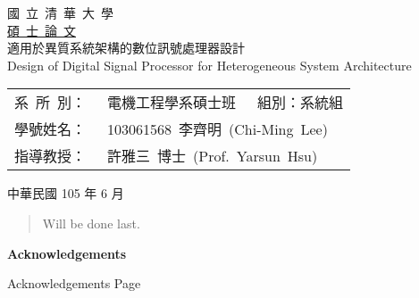 \documentclass[12pt]{article}
\begin{document}
\begin{CJK}{UTF8}{bkai}

\begin{titlepage}
\begin{center}
\Huge 國~立~清~華~大~學 \\ [1.5ex]
\Huge \underline{碩~士~論~文} \\
\vspace*{10ex}
\huge 適用於異質系統架構的數位訊號處理器設計 \\
\vspace*{1ex}
\huge Design of Digital Signal Processor for Heterogeneous System Architecture  \\

\null
\vfill

\Large
\begin{tabular}{r@{\centering} @{}l}
    系\ 所\ 別：~&電機工程學系碩士班\ \ \ 組別：系統組	\\ [1.5ex]
    學號姓名：~&103061568~李齊明~(Chi-Ming~Lee)      \\ [1.5ex]
    指導教授：~&許雅三~博士~(Prof.~Yarsun~Hsu)       \\
	
\end{tabular}

\vspace*{2ex}
\Large 中華民國 105 年 6 月
\end{center}
\end{titlepage}

\doublespacing
{}
\setcounter{page}{3}

\renewcommand{\abstractnamefont}{\normalfont\bfseries}
\renewcommand{\abstracttextfont}{\normalfont}
\setlength{\absleftindent}{0pt}
\setlength{\absrightindent}{0pt}

\begin{abstract}  %
	Will be done last.
\end{abstract}
\clearpage
{}

\begin{center}
\textbf{Acknowledgements}
\end{center}
Acknowledgements Page
\clearpage

\singlespacing

\tableofcontents  %
\clearpage
{}
\listoffigures  %
\clearpage
{}
\listoftables  %
\clearpage


\end{CJK}
\end{document}
